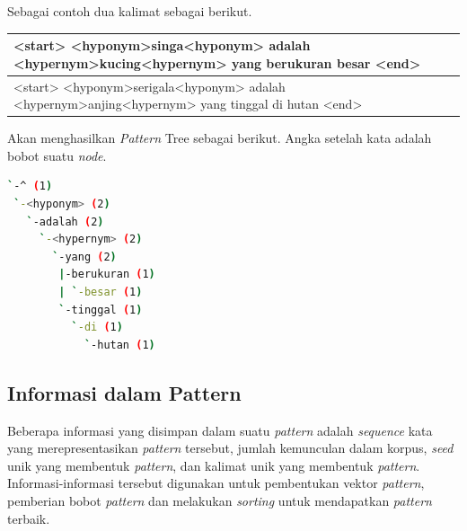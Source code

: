 \noindent Sebagai contoh dua kalimat sebagai berikut.
\begin{center}
\begin{tabular}{ | m{32em} | } 
\hline
<start> <hyponym>singa<hyponym> adalah <hypernym>kucing<hypernym> yang berukuran besar <end> \\ 
\hline
\hline
<start> <hyponym>serigala<hyponym> adalah <hypernym>anjing<hypernym> yang tinggal di hutan <end>\\ 
\hline
\end{tabular}
\end{center}

\noindent Akan menghasilkan \textit{Pattern} Tree sebagai berikut. Angka setelah kata adalah bobot suatu \textit{node}.
\begin{lstlisting}[language=bash]
`-^ (1)
 `-<hyponym> (2)
   `-adalah (2)
     `-<hypernym> (2)
       `-yang (2)
        |-berukuran (1)
        | `-besar (1)
        `-tinggal (1)
          `-di (1)
            `-hutan (1)
\end{lstlisting}

\subsection{Informasi dalam Pattern}
Beberapa informasi yang disimpan dalam suatu \textit{pattern} adalah \textit{sequence} kata yang merepresentasikan \textit{pattern} tersebut, jumlah kemunculan dalam korpus, \textit{seed} unik yang membentuk \textit{pattern}, dan kalimat unik yang membentuk \textit{pattern}. Informasi-informasi tersebut digunakan untuk pembentukan vektor \textit{pattern}, pemberian bobot \textit{pattern} dan melakukan \textit{sorting} untuk mendapatkan \textit{pattern} terbaik.


